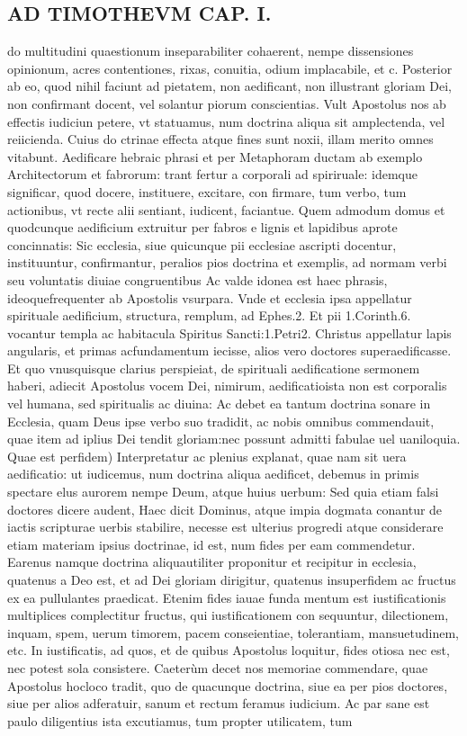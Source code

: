 \documentclass{article}
\begin{document}
\begin{pages}
\section*{AD TIMOTHEVM CAP. I. }
\marginpar{[ p.16 ]}\pstart do multitudini quaestionum inseparabiliter cohaerent, nempe dissensiones opinionum, acres contentiones, rixas, conuitia, odium implacabile, et c. Posterior ab eo, quod nihil faciunt ad pietatem, non aedificant, non illustrant gloriam Dei, non confirmant docent, vel solantur piorum conscientias. Vult Apostolus nos ab effectis iudiciun petere, vt statuamus, num doctrina aliqua sit amplectenda, vel reiicienda. Cuius do ctrinae effecta atque  fines sunt noxii, illam merito omnes vitabunt. Aedificare hebraic phrasi et per Metaphoram ductam ab exemplo Architectorum et fabrorum: trant fertur a corporali ad spiriruale: idemque  significar, quod docere, instituere, excitare, con firmare, tum verbo, tum actionibus, vt recte alii sentiant, iudicent, faciantue. Quem admodum domus et quodcunque  aedificium extruitur per fabros e lignis et lapidibus aprote concinnatis: Sic ecclesia, siue quicunque  pii ecclesiae ascripti docentur, instituuntur, confirmantur, peralios pios doctrina et exemplis, ad normam verbi seu voluntatis diuiae congruentibus  Ac valde idonea est haec phrasis, ideoquefrequenter ab Apostolis vsurpara. Vnde et ecclesia ipsa appellatur spirituale aedificium, structura, remplum, ad Ephes.2. Et pii 1.Corinth.6. vocantur templa ac habitacula Spiritus Sancti:1.Petri2. Christus appellatur lapis angularis, et primas acfundamentum iecisse, alios vero doctores superaedificasse. Et quo vnusquisque  clarius perspieiat, de spirituali aedificatione sermonem haberi, adiecit Apostolus vocem Dei, nimirum, aedificatioista non est corporalis vel humana, sed spiritualis ac diuina: Ac debet ea tantum doctrina sonare in Ecclesia, quam Deus ipse verbo suo tradidit, ac nobis omnibus commendauit, quae item ad iplius Dei tendit gloriam:nec possunt admitti fabulae uel uaniloquia.  \pend\pstart Quae est perfidem) Interpretatur ac plenius explanat, quae nam sit uera aedificatio: ut iudicemus, num doctrina aliqua aedificet, debemus in primis spectare elus aurorem nempe Deum, atque huius uerbum: Sed quia etiam falsi doctores dicere audent, Haec dicit Dominus, atque impia dogmata conantur de iactis scripturae uerbis stabilire, necesse est ulterius progredi atque considerare etiam materiam ipsius doctrinae, id est, num fides per eam commendetur. Earenus namque  doctrina aliquautiliter proponitur et recipitur in ecclesia, quatenus a Deo est, et ad Dei gloriam dirigitur, quatenus insuperfidem ac fructus ex ea pullulantes praedicat. Etenim fides iauae funda mentum est iustificationis multiplices complectitur fructus, qui iustificationem con sequuntur, dilectionem, inquam, spem, uerum timorem, pacem conseientiae, tolerantiam, mansuetudinem, etc. In iustificatis, ad quos, et de quibus Apostolus loquitur, fides otiosa nec est, nec potest sola consistere.  \pend\pstart Caeterùm decet nos memoriae commendare, quae Apostolus hocloco tradit, quo de quacunque doctrina, siue ea per pios doctores, siue per alios adferatuir, sanum et rectum feramus iudicium. Ac par sane est paulo diligentius ista excutiamus, tum propter utilicatem, tum 
\end{pages}
\end{document}
